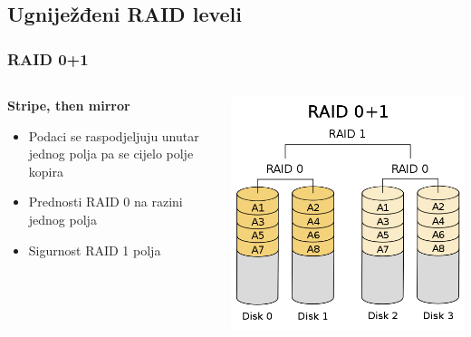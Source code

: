 \documentclass[t]{beamer}
\begin{document}
\subsection{Ugniježđeni RAID leveli}
        \begin{frame}
	\frametitle{RAID 0+1}
	
	\begin{columns}[T]
	\begin{column}{0.55\textwidth}
		\textbf{Stripe, then mirror}
		\begin{itemize}
			\item Podaci se raspodjeljuju unutar jednog polja pa se cijelo polje kopira
		\end{itemize}
		\begin{itemize}
			\item Prednosti RAID 0 na razini jednog polja
			\item Sigurnost RAID 1 polja
		\end{itemize}
	\end{column}
	\begin{column}{0.45\textwidth}
		\includegraphics[width=\textwidth]{500px-RAID_01.png}
	\end{column}
	\end{columns}
\end{frame}
\end{document}
